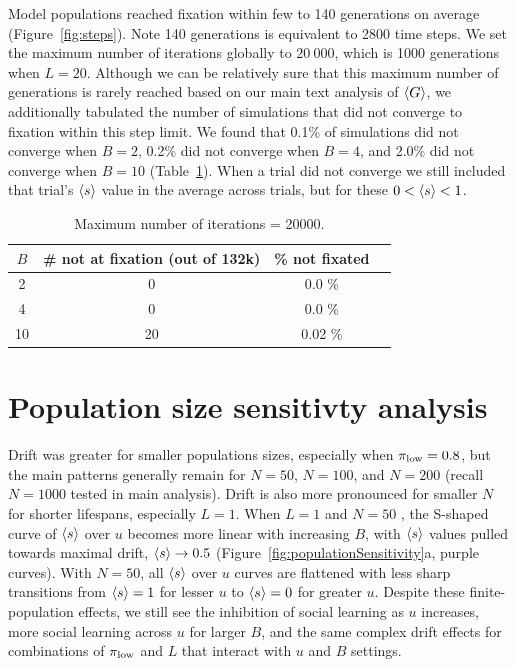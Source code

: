 \documentclass[letterpaper,11.5pt]{scrartcl}
\begin{document}
Model populations reached fixation within few to 140 generations on
average (Figure~\ref{fig:steps}).
Note 140 generations is equivalent to 2800 time steps. We set the maximum 
number of iterations globally to $20~000$, which is 1000 generations when
$L=20$. Although we can be relatively sure that this maximum number of 
generations is rarely reached based on our main text analysis of $\langle G \rangle$,
we additionally tabulated the number of simulations that did not converge to
fixation
within this step limit. We found that 0.1\% of simulations did not converge
when $B=2$, 0.2\% did not converge when $B=4$, and 2.0\% did not converge
when $B=10$ (Table~\ref{tab:convergence}). When a trial did not converge we
still included that trial's $\langle s \rangle$ value in the average across trials,
but for these $0 < \langle s \rangle < 1$.

\begin{table}[h] \caption{Maximum number of iterations = 20000.} \label{tab:convergence} \centering
  \begin{tabular}{cccc} 
    \toprule $B$ & \# not at fixation (out of 132k) & \% not fixated \\ 
    \midrule  2  & 0  & 0.0 \% \\ 
              4  & 0  & 0.0 \% \\ 
              10 & 20 & 0.02 \% \\ 
    \bottomrule \end{tabular} 
\end{table}



\newpage

\section{Population size sensitivty analysis}

Drift was greater for smaller populations sizes, especially when $\pi_{\mathrm{low}}=0.8$, but 
the main patterns generally remain for $N=50$, $N=100$, and $N=200$ (recall
$N=1000$ tested in main analysis). Drift is also more pronounced for smaller $N$
for shorter lifespans, especially $L=1$. When $L=1$ and $N=50$ , the S-shaped
curve of $\langle s \rangle$ over $u$ becomes more linear with increasing $B$, 
with $\langle s \rangle$ values pulled towards maximal drift, $\langle s \rangle \to 0.5$ (Figure~\ref{fig:populationSensitivity}a,
purple curves). With
$N=50$, all $\langle s \rangle$ over $u$ curves are flattened with less sharp transitions
from $\langle s \rangle = 1$ for lesser $u$ to $\langle s \rangle = 0$ for greater $u$. Despite
these finite-population effects, we still see the inhibition of social learning
as $u$ increases, more social learning across $u$ for larger $B$, and the
same complex drift effects for combinations of $\pi_{\mathrm{low}}$ and $L$ that interact
with $u$ and $B$ settings.
\end{document}
